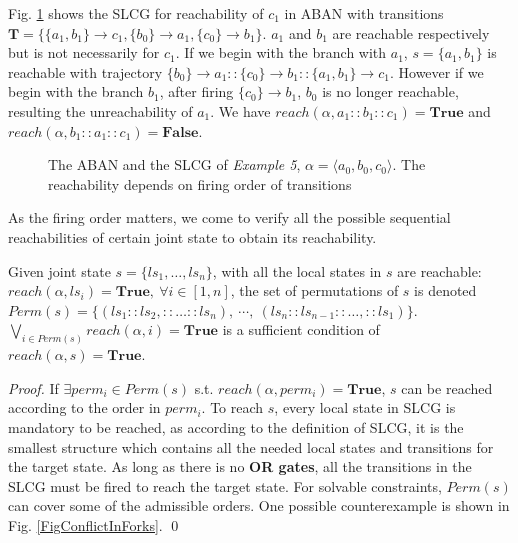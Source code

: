 \documentclass[runningheads]{llncs}
\newcommand{\acm}[3]{\{#1\}\rightarrow#3}
\begin{document}
\begin{example}
Fig. \ref{fig:5} shows the SLCG for reachability of $c_1$ in ABAN with transitions $\mathbf{T}=\{\acm{a_1,b_1}{c_0}{c_1},\acm{b_0}{a_0}{a_1},\acm{c_0}{b_0}{b_1}\}$.
$a_1$ and $b_1$ are reachable respectively but is not necessarily for $c_1$.
If we begin with the branch with $a_1$, $s=\{a_1,b_1\}$ is reachable with trajectory $\acm{b_0}{a_0}{a_1}::\acm{c_0}{b_0}{b_1}::\acm{a_1,b_1}{c_0}{c_1}$. 
However if we begin with the branch $b_1$, after firing $\acm{c_0}{b_0}{b_1}$, $b_0$ is no longer reachable, resulting the unreachability of $a_1$.
We have $reach(\alpha,a_1::b_1::c_1)=\mathbf{True}$ and $reach(\alpha,b_1::a_1::c_1)=\mathbf{False}$.
\end{example}
\begin{figure}[ht]
\centering

\caption{The ABAN and the SLCG of \textit{Example 5}, $\alpha=\langle a_0,b_0,c_0\rangle$. 
The reachability depends on firing order of transitions}
\label{fig:5}
\end{figure}



As the firing order matters, we come to verify all the possible sequential reachabilities of certain joint state to obtain its reachability.

\begin{proposition}\label{theoperm}
Given joint state $s=\{ls_1,\ldots,ls_n\}$, with all the local states in $s$ are reachable: $reach(\alpha,ls_i)=\mathbf{True},\ \forall i\in[1,n]$, the set of permutations of $s$ is denoted $Perm(s)=\{(ls_1::ls_2,::\ldots ::ls_n),\ \cdots,\ (ls_n::ls_{n-1}::\ldots,::ls_1)\}$. $\bigvee_{i\in Perm(s)} reach(\alpha,i)=\mathbf{True}$ is a sufficient condition of $reach(\alpha,s)=\mathbf{True}$.
\end{proposition}
\begin{proof}
If $\exists perm_i\in Perm(s)$ s.t. $reach(\alpha,perm_i)=\mathbf{True}$, $s$ can be reached according to the order in $perm_i$.
To reach $s$, every local state in SLCG is mandatory to be reached, as according to the definition of SLCG, it is the smallest structure which contains all the needed local states and transitions for the target state. As long as there is no \textbf{OR gates}, all the transitions in the SLCG must be fired to reach the target state.
For solvable constraints, $Perm(s)$ can cover some of the admissible orders.
One possible counterexample is shown in Fig. \ref{FigConflictInForks}.
\qed\end{proof}
\end{document}
